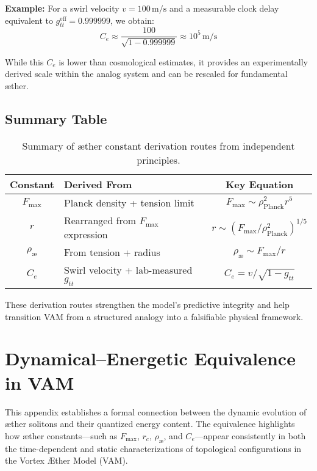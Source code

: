 \textbf{Example:} For a swirl velocity $v = 100 \, \text{m/s}$ and a measurable clock delay equivalent to $g_{tt}^{\text{eff}} = 0.999999$, we obtain:
\begin{equation}
    C_e \approx \frac{100}{\sqrt{1 - 0.999999}} \approx 10^5 \, \text{m/s}
\end{equation}

While this $C_e$ is lower than cosmological estimates, it provides an experimentally derived scale within the analog system and can be rescaled for fundamental æther.

\subsection{ Summary Table}

\begin{table}[H]
\centering
\renewcommand{\arraystretch}{1.2}
\begin{tabular}{|c|l|c|}
\hline
\textbf{Constant} & \textbf{Derived From} & \textbf{Key Equation} \\
\hline
$F_{\max}$ & Planck density + tension limit & $F_{\max} \sim \rho_{\text{Planck}}^2 r^5$ \\
$r$ & Rearranged from $F_{\max}$ expression & $r \sim \left(F_{\max} / \rho_{\text{Planck}}^2\right)^{1/5}$ \\
$\rho_{\text{æ}}$ & From tension + radius & $\rho_{\text{æ}} \sim F_{\max} / r$ \\
$C_e$ & Swirl velocity + lab-measured $g_{tt}$ & $C_e = v / \sqrt{1 - g_{tt}}$ \\
\hline
\end{tabular}
\caption{Summary of æther constant derivation routes from independent principles.}
\end{table}

\vspace{1em}

These derivation routes strengthen the model’s predictive integrity and help transition VAM from a structured analogy into a falsifiable physical framework.


\section{Dynamical–Energetic Equivalence in VAM}

This appendix establishes a formal connection between the dynamic evolution of æther solitons and their quantized energy content. The equivalence highlights how æther constants—such as $F_{\max}$, $r_c$, $\rho_{\text{æ}}$, and $C_e$—appear consistently in both the time-dependent and static characterizations of topological configurations in the Vortex Æther Model (VAM).

